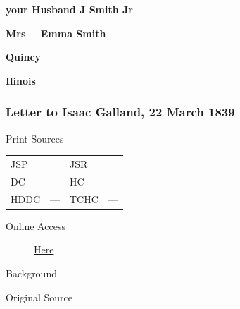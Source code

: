 					\begin{tightright}
					\textbf{your Husband J Smith Jr}
					\end{tightright}

					\textbf{Mrs--- Emma Smith}

					\textbf{Quincy}

					\textbf{Ilinois}
					
		\subsubsection{Letter to Isaac Galland, 22 March 1839}
			\label{EMS-1839-JS-22-MAR-1839}
			
			\begin{description}
					\item[Print Sources]
				\end{description}

					\begin{tabular}{p{0.5in}p{1in}p{0.5in}p{1in}}
					JSP	 	& 			& JSR 		&  \\
					DC	 	& ---		& HC 		& --- \\
					HDDC 	& ---		& TCHC 		& --- \\
					\end{tabular}
				
				\begin{description}
					\item[Online Access] \href{https://www.josephsmithpapers.org/paper-summary/letter-to-isaac-galland-22-march-1839/1}{Here}
				\end{description}
				
				\begin{description}
					\item[Background]
				\end{description}
				
				
				\begin{description}
					\item[Original Source]
				\end{description}
				
